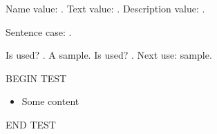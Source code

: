 \documentclass{article}
\begin{document}
Name value: .
Text value: .
Description value: .

Sentence case: .

Is used? .
A \gls{sample}.
Is used? .
Next use: \gls{sample}.

\printglossaries

\newenvironment{test}{BEGIN TEST\begin{itemize}}{\end{itemize}END TEST}
\begin{test}\item Some content\end{test}
\end{document}
